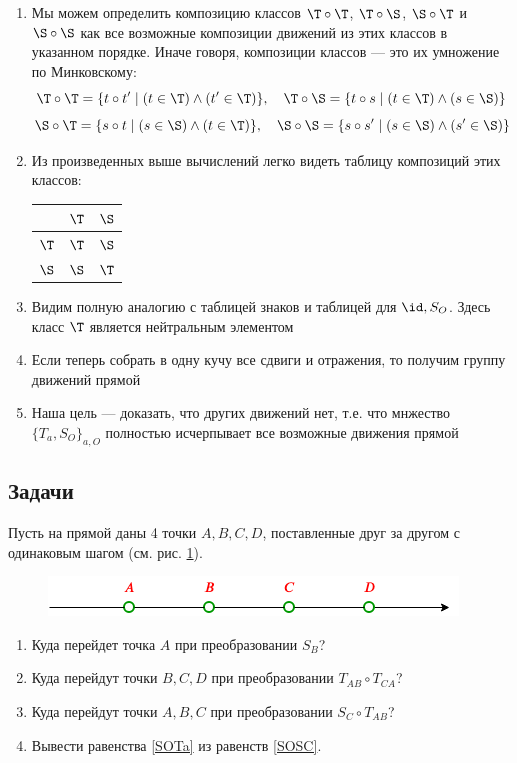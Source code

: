 \begin{enumerate}
\item Мы можем определить композицию классов $\T\circ \T$, $\T\circ \S$, $\S\circ \T$ и $\S\circ \S$ как все возможные композиции движений из этих классов в указанном порядке. Иначе говоря, композиции классов --- это их умножение по Минковскому:
$$
\T\circ \T = \{t\circ t'\mid (t\in\T)\land(t'\in\T)\},\quad \T\circ \S = \{t\circ s\mid (t\in\T)\land(s\in\S)\}
$$
$$
\S\circ \T = \{s\circ t\mid (s\in\S)\land(t\in\T)\},\quad \S\circ \S = \{s\circ s'\mid (s\in\S)\land(s'\in\S)\}
$$
\item Из произведенных выше вычислений легко видеть таблицу композиций этих классов:
\begin{center}
\begin{tabular}{c|c|c|}
  & $\T$ & $\S$ \\
 \hline
$\T$ & $\T$ & $\S$ \\
 \hline
$\S$ & $\S$ & $\T$ \\
\hline
\end{tabular}
\end{center}
\item Видим полную аналогию с таблицей знаков и таблицей для $\id, S_O$. Здесь класс $\T$ является нейтральным элементом
\item Если теперь собрать в одну кучу все сдвиги и отражения, то получим группу движений прямой
\item Наша цель --- доказать, что других движений нет, т.е. что мнжество $\{T_a,S_O\}_{a,O}$ полностью исчерпывает все возможные движения прямой
\end{enumerate}

\subsection*{Задачи}

Пусть на прямой даны 4 точки $A,B,C,D$, поставленные друг за другом с одинаковым шагом (см. рис. \ref{ABCD}).
\begin{figure}[hbt!]
\begin{center}
\includegraphics[scale=0.7]{ABCD.png}
\end{center}
\caption{}\label{ABCD}
\end{figure}

\begin{enumerate}
\item Куда перейдет точка $A$ при преобразовании $S_B$?
\item Куда перейдут точки $B,C,D$ при преобразовании $T_{AB}\circ T_{CA}$?
\item Куда перейдут точки $A,B,C$ при преобразовании $S_C\circ T_{AB}$?
\item Вывести равенства \eqref{SOTa} из равенств \eqref{SOSC}.
\end{enumerate}



